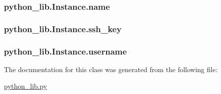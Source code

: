 \hypertarget{classpython__lib_1_1_instance_a0fd04ce14016b7d0856233f490503ab9}{
\subsubsection[{name}]{\setlength{\rightskip}{0pt plus 5cm}python\-\_\-lib.\-Instance.\-name}}\label{classpython__lib_1_1_instance_a0fd04ce14016b7d0856233f490503ab9}
\hypertarget{classpython__lib_1_1_instance_af626e75528d2014eba57f2f158b99e93}{
\subsubsection[{ssh\-\_\-key}]{\setlength{\rightskip}{0pt plus 5cm}python\-\_\-lib.\-Instance.\-ssh\-\_\-key}}\label{classpython__lib_1_1_instance_af626e75528d2014eba57f2f158b99e93}
\hypertarget{classpython__lib_1_1_instance_a425ff7c7985f4f5c0ceee7dd763db9e2}{
\subsubsection[{username}]{\setlength{\rightskip}{0pt plus 5cm}python\-\_\-lib.\-Instance.\-username}}\label{classpython__lib_1_1_instance_a425ff7c7985f4f5c0ceee7dd763db9e2}


The documentation for this class was generated from the following file\-:\begin{DoxyCompactItemize}
\item 
\hyperlink{python__lib_8py}{python\-\_\-lib.\-py}\end{DoxyCompactItemize}

